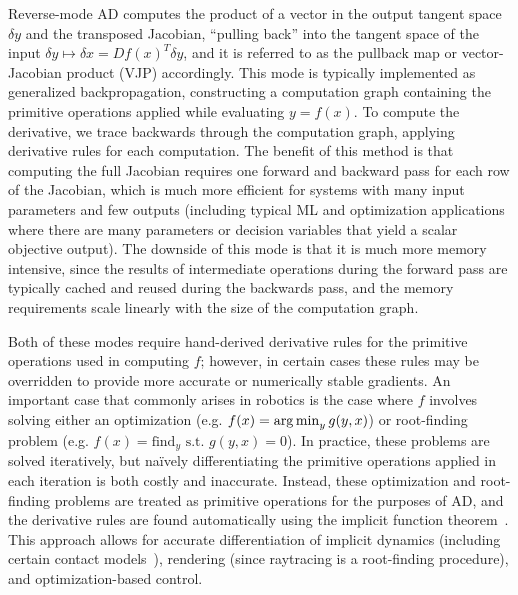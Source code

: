 Reverse-mode AD computes the product of a vector in the output tangent space $\delta y$ and the transposed Jacobian, ``pulling back'' into the tangent space of the input $\delta y \mapsto \delta x = Df(x)^T \delta y$, and it is referred to as the pullback map or vector-Jacobian product (VJP) accordingly. This mode is typically implemented as generalized backpropagation, constructing a computation graph containing the primitive operations applied while evaluating $y = f(x)$. To compute the derivative, we trace backwards through the computation graph, applying derivative rules for each computation. The benefit of this method is that computing the full Jacobian requires one forward and backward pass for each row of the Jacobian, which is much more efficient for systems with many input parameters and few outputs (including typical ML and optimization applications where there are many parameters or decision variables that yield a scalar objective output). The downside of this mode is that it is much more memory intensive, since the results of intermediate operations during the forward pass are typically cached and reused during the backwards pass, and the memory requirements scale linearly with the size of the computation graph.

Both of these modes require hand-derived derivative rules for the primitive operations used in computing $f$; however, in certain cases these rules may be overridden to provide more accurate or numerically stable gradients. An important case that commonly arises in robotics is the case where $f$ involves solving either an optimization (e.g. $f(x) = \operatorname*{arg\,min}_y g(y, x)$) or root-finding problem (e.g. $f(x) = \text{find}_y \text{ s.t. } g(y, x) = 0$). In practice, these problems are solved iteratively, but na\"ively differentiating the primitive operations applied in each iteration is both costly and inaccurate. Instead, these optimization and root-finding problems are treated as primitive operations for the purposes of AD, and the derivative rules are found automatically using the implicit function theorem~\cite{agrawalDifferentiableConvexOptimization2019}. This approach allows for accurate differentiation of implicit dynamics (including certain contact models~\cite{howelllecleach2022}), rendering (since raytracing is a root-finding procedure), and optimization-based control.

